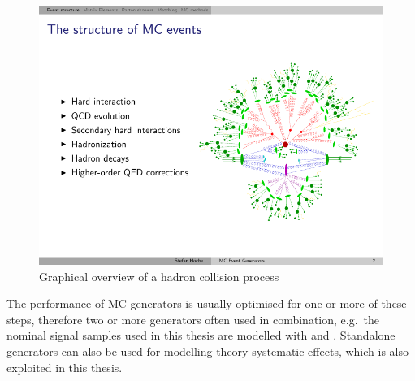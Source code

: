 \begin{figure}[htbp]
  \centering
  \leavevmode
  \includegraphics[width=0.7\columnwidth]{MC_simulation_graphics}
  \caption[Graphical overview of a hadron collision process]{Graphical overview of a hadron collision process
  \autocite{Hoeche_slides}}
  \label{fig:MC_simulation_graphics}
\end{figure}

The performance of MC generators is usually optimised for one or more of these steps, therefore two or more generators
often used in combination, e.g.\ the nominal \ttbar signal samples used in this thesis are modelled with \MADGRAPH and
\PYTHIA. Standalone generators can also be used for modelling theory systematic effects, which is also exploited in this
thesis.


